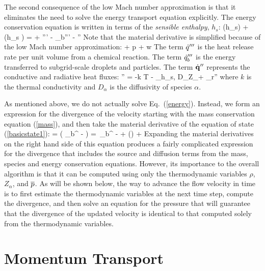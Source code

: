 The second consequence of the low Mach number approximation is that it eliminates the need to solve the energy transport
equation explicitly.
The energy conservation equation is written in terms of the {\em sensible enthalpy}, $h_s$:
\be {}(\rho h_s) + \nabla\!\cdot (\rho h_s \bu) =   + \dq''' - \dq_b'''
        - \nabla\!\cdot \dbq'' \label{energy} \ee
Note that the material derivative is simplified because of the low Mach number approximation:
\be
    \equiv {} + \bu \cdot \nabla p \approx
    + w 
\ee
The term
$\dot{q}'''$ is the heat release rate per unit volume from a chemical reaction.
The term $\dot{q}_b'''$ is the energy transferred to subgrid-scale droplets and particles.
The term $\dot{\bf q}''$ represents the conductive and radiative heat fluxes:
\be \dbq'' = -k \nabla T - \sum_\alpha h_{s,\alpha} \rho D_\alpha \nabla Z_\alpha + \dbq_r'' \ee
where $k$ is the thermal conductivity and $D_\alpha$ is the diffusivity of species $\alpha$.

As mentioned above, we do not actually solve Eq.~(\ref{energy}). Instead, we form an expression for the divergence of
the velocity starting with the mass conservation equation (\ref{mass}), and then take the material
derivative of the equation of state (\ref{basicstate1}):
\be
\label{eqn_simplediv1}
\Div{} =  \left( _b^{\tripleprime} -   \right) =
 \,_b^{\tripleprime} -    +
 \left(\right) +
 
\ee
Expanding the material derivatives on the right hand side of this equation produces a fairly complicated expression for
the divergence that includes the source and diffusion terms from the mass, species and energy conservation equations.
However, its importance to the overall algorithm is that it can be computed using only the
thermodynamic variables $\rho$, $Z_\alpha$, and $\overline{p}$. As will be shown below, the way to advance the flow velocity in time
is to first estimate the thermodynamic variables at the next time step, compute the divergence, and then solve an equation
for the pressure that will guarantee that the divergence of the updated velocity is identical to that computed solely from
the thermodynamic variables.



\section{Momentum Transport}

